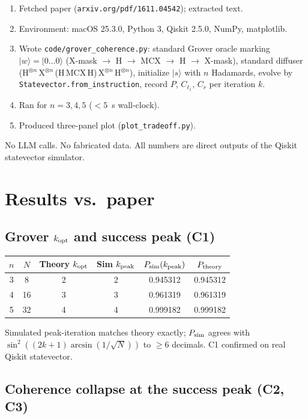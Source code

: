 \documentclass[11pt]{article}
\begin{document}
\begin{enumerate}
\item Fetched paper (\texttt{arxiv.org/pdf/1611.04542}); extracted text.
\item Environment: macOS 25.3.0, Python 3, Qiskit 2.5.0, NumPy, matplotlib.
\item Wrote \texttt{code/grover\_coherence.py}: standard Grover oracle
      marking $|w\rangle{=}|0\ldots0\rangle$ (X-mask $\to$ H $\to$ MCX $\to$
      H $\to$ X-mask), standard diffuser
      (H$^{\otimes n}\,$X$^{\otimes n}\,$(H$\,$MCX$\,$H)$\,$X$^{\otimes n}\,$H$^{\otimes n}$),
      initialize $|s\rangle$ with $n$ Hadamards, evolve by
      \texttt{Statevector.from\_instruction}, record $P$, $C_{\ell_1}$,
      $C_r$ per iteration $k$.
\item Ran for $n = 3, 4, 5$ ($<5$~s wall-clock).
\item Produced three-panel plot (\texttt{plot\_tradeoff.py}).
\end{enumerate}

No LLM calls. No fabricated data. All numbers are direct outputs of the
Qiskit statevector simulator.

\section{Results vs.\ paper}

\subsection{Grover $k_{\rm opt}$ and success peak (C1)}

\begin{tabular}{cccccc}
\toprule
$n$ & $N$ & Theory $k_{\rm opt}$ & Sim $k_{\rm peak}$ & $P_{\rm sim}(k_{\rm peak})$ & $P_{\rm theory}$ \\
\midrule
3 & 8  & 2 & 2 & 0.945312 & 0.945312 \\
4 & 16 & 3 & 3 & 0.961319 & 0.961319 \\
5 & 32 & 4 & 4 & 0.999182 & 0.999182 \\
\bottomrule
\end{tabular}

Simulated peak-iteration matches theory exactly; $P_{\rm sim}$ agrees
with $\sin^2((2k{+}1)\arcsin(1/\sqrt N))$ to $\ge 6$ decimals. C1
confirmed on real Qiskit statevector.

\subsection{Coherence collapse at the success peak (C2, C3)}
\end{document}
